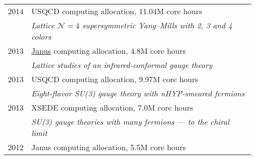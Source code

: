 \begin{spacelist}
\begin{tabular}[t]{cl}
      2014 & USQCD computing allocation, 11.04M core hours                                                                                                                                                                             \\ %
           & \textit{Lattice $\mathcal N = 4$ supersymmetric Yang--Mills with 2, 3 and 4 colors}                                                                                                                                       \\[6 pt]
      2013 & \href{https://www.top500.org/system/176922}{Janus} computing allocation, 4.8M core hours                                                                                                                                  \\ %
           & \textit{Lattice studies of an infrared-conformal gauge theory}                                                                                                                                                            \\[6 pt]
      2013 & USQCD computing allocation, 9.97M core hours                                                                                                                                                                              \\ %
           & \textit{Eight-flavor SU(3) gauge theory with nHYP-smeared fermions}                                                                                                                                                       \\[6 pt]
      2013 & XSEDE computing allocation, 7.0M core hours                                                                                                                                                                               \\ %
           & \textit{SU(3) gauge theories with many fermions --- to the chiral limit}                                                                                                                                                  \\[6 pt]
      2012 & Janus computing allocation, 5.5M core hours                                                                                                                                                                               \\ %

\end{tabular}
\end{spacelist}
